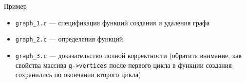 \documentclass[hyperref={unicode=true}]{beamer}
\begin{document}
    \begin{frame}{Пример}
    \begin{itemize}
    \item \texttt{graph\_1.c} --- спецификация функций создания и удаления
    графа
    \item \texttt{graph\_2.c} --- определения функций
    \item \texttt{graph\_3.c} --- доказательство полной корректности
    (обратите внимание, как свойства массива \texttt{g->vertices} после
     первого цикла в функции создания сохранились по окончании второго цикла)
    \end{itemize}
    \end{frame}
\end{document}
